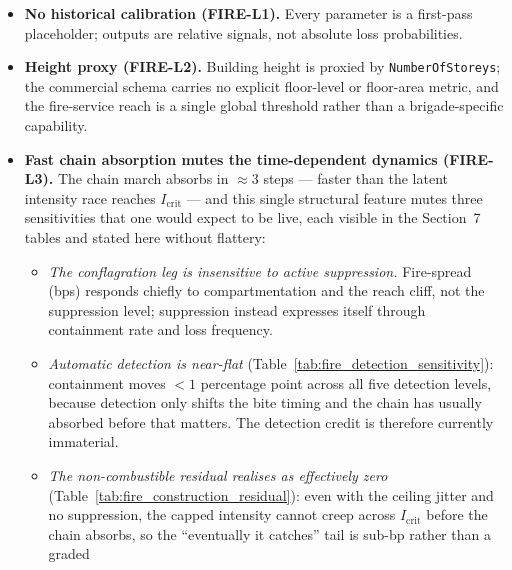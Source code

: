 \documentclass[11pt,a4paper]{article}
\begin{document}
\mkmlimitations

\begin{itemize}
  \item \textbf{No historical calibration (FIRE-L1).} Every parameter is a
        first-pass placeholder; outputs are relative signals, not absolute loss
        probabilities.
  \item \textbf{Height proxy (FIRE-L2).} Building height is proxied by
        \texttt{NumberOfStoreys}; the commercial schema carries no explicit
        floor-level or floor-area metric, and the fire-service reach is a single
        global threshold rather than a brigade-specific capability.
  \item \textbf{Fast chain absorption mutes the time-dependent dynamics
        (FIRE-L3).} The chain march absorbs in $\approx 3$ steps --- faster than
        the latent intensity race reaches $I_{\text{crit}}$ --- and this single
        structural feature mutes three sensitivities that one would expect to be
        live, each visible in the Section~7 tables and stated here without
        flattery:
        \begin{itemize}
          \item \emph{The conflagration leg is insensitive to active
                suppression.} Fire-spread (bps) responds chiefly to
                compartmentation and the reach cliff, not the suppression level;
                suppression instead expresses itself through containment rate and
                loss frequency.
          \item \emph{Automatic detection is near-flat}
                (Table~\ref{tab:fire_detection_sensitivity}): containment moves
                $<1$ percentage point across all five detection levels, because
                detection only shifts the bite timing and the chain has usually
                absorbed before that matters. The detection credit is therefore
                currently immaterial.
          \item \emph{The non-combustible residual realises as effectively zero}
                (Table~\ref{tab:fire_construction_residual}): even with the
                ceiling jitter and no suppression, the capped intensity cannot
                creep across $I_{\text{crit}}$ before the chain absorbs, so the
                ``eventually it catches'' tail is sub-bp rather than a graded

\end{itemize}
\end{itemize}
\end{document}
